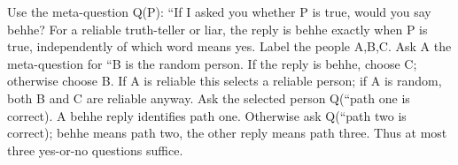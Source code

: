 Use the meta-question Q(P): ``If I asked you whether P is true, would you say behhe? For a reliable truth-teller or liar, the reply is behhe exactly when P is true, independently of which word means yes. Label the people A,B,C. Ask A the meta-question for ``B is the random person. If the reply is behhe, choose C; otherwise choose B. If A is reliable this selects a reliable person; if A is random, both B and C are reliable anyway. Ask the selected person Q(``path one is correct). A behhe reply identifies path one. Otherwise ask Q(``path two is correct); behhe means path two, the other reply means path three. Thus at most three yes-or-no questions suffice.
